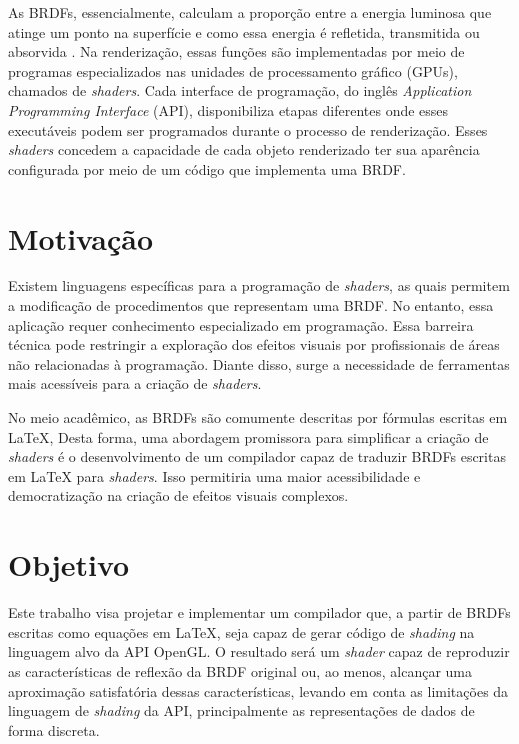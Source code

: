 \documentclass[english,
               brazil,
               bsc] %
               {dcomp-abntex2}
\begin{document}
As BRDFs, essencialmente, calculam a proporção entre a energia luminosa que atinge um ponto na superfície e como essa energia é refletida, transmitida ou absorvida \cite{pbr}. Na renderização, essas funções são implementadas por meio de programas especializados nas unidades de processamento gráfico (GPUs), chamados de \textit{shaders}. Cada interface de programação, do inglês \textit{ Application Programming Interface} (API),  disponibiliza etapas diferentes onde esses executáveis podem ser programados durante o processo de renderização. Esses \textit{shaders} concedem a capacidade de cada objeto renderizado ter sua aparência configurada por meio de um código que implementa uma BRDF.




\section{Motivação}




Existem linguagens específicas para a programação de \textit{shaders}, as quais permitem a modificação de procedimentos que representam uma BRDF. No entanto, essa aplicação requer conhecimento especializado em programação. Essa barreira técnica pode restringir a exploração dos efeitos visuais por profissionais de áreas não relacionadas à programação. Diante disso, surge a necessidade de ferramentas mais acessíveis para a criação de \textit{shaders}.


No meio acadêmico, as BRDFs são comumente descritas por fórmulas escritas em \LaTeX{}, Desta forma, uma abordagem promissora para simplificar a criação de \textit{shaders} é o desenvolvimento de um compilador capaz de traduzir BRDFs   escritas em \LaTeX{} para \textit{shaders}. Isso permitiria uma maior acessibilidade e democratização na criação de efeitos visuais complexos.


\section{Objetivo}
Este trabalho visa projetar e implementar um compilador que, a partir de BRDFs escritas como equações em \LaTeX{}, seja capaz de gerar código de \textit{shading} na linguagem alvo da API OpenGL. O resultado será um \textit{shader} capaz de reproduzir as características de reflexão da BRDF original ou, ao menos, alcançar uma aproximação satisfatória dessas características, levando em conta as limitações da linguagem de \textit{shading} da API, principalmente as representações de dados de forma discreta. 
\end{document}
